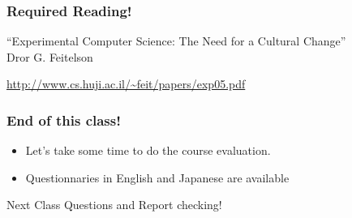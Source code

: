 \documentclass[10pt]{beamer}
\begin{document}
\begin{frame}
  \frametitle{Required Reading!}
  \begin{center}
    ``Experimental Computer Science: The Need for a Cultural Change''\\
    Dror G. Feitelson
  \end{center}

  \bigskip

  \url{http://www.cs.huji.ac.il/~feit/papers/exp05.pdf}
\end{frame}

\begin{frame}
  \frametitle{End of this class!}

  \begin{itemize}
  \item Let's take some time to do the course evaluation. 
  \item Questionnaries in English and Japanese are available
  \end{itemize}

  \begin{block}{Next Class}
    Questions and Report checking!
  \end{block}

\end{frame}
\end{document}
